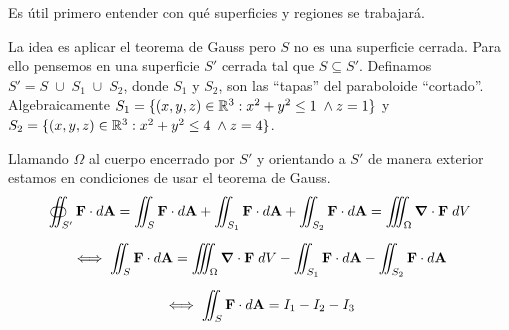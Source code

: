 \newpage
\begin{solution}
    Es \'util primero entender con qu\'e superficies y regiones se trabajar\'a.
    \begin{center}
    \end{center}

    La idea es aplicar el teorema de Gauss pero  $S$ no es una superficie cerrada.   Para ello pensemos en una superficie $S'$  cerrada tal  que $S \subseteq S'.$  Definamos   $S'=S\;\cup\;S_1\;\cup\;S_2$,  donde $S_1$ y $S_2$, son las ``tapas'' del paraboloide ``cortado''.  Algebraicamente $S_1=\{(x,y,z)\in \mathbb{R}^3 : x^2+y^2\le 1\;\land z=1\}$ y $S_2=\{(x,y,z)\in \mathbb{R}^3 : x^2+y^2\le4\;\land z=4\}$.

    Llamando  $\Omega$  al cuerpo encerrado por $S'$ y orientando a $S'$ de manera exterior estamos en condiciones de usar el teorema de Gauss.
    \begin{gather*}
        \oiint _{S'} \mathbf{F}\cdot d\mathbf{A} =
        \iint _{S} \mathbf{F}\cdot d\mathbf{A} +
        \iint _{S_1} \mathbf{F}\cdot d\mathbf{A} +
        \iint _{S_2} \mathbf{F}\cdot d\mathbf{A}
        =\iiint _\Omega \grad \cdot \mathbf{F}\;dV\\[.2cm]
        \iff \iint _{S} \mathbf{F}\cdot d\mathbf{A} =
        \iiint _\Omega \grad \cdot \mathbf{F}\;dV -
        \iint _{S_1} \mathbf{F}\cdot d\mathbf{A} -
        \iint _{S_2} \mathbf{F}\cdot d\mathbf{A}\\[.2cm]
        \iff \iint _{S} \mathbf{F}\cdot d\mathbf{A} =
        I_1-I_2-I_3
    \end{gather*}


\end{solution}
